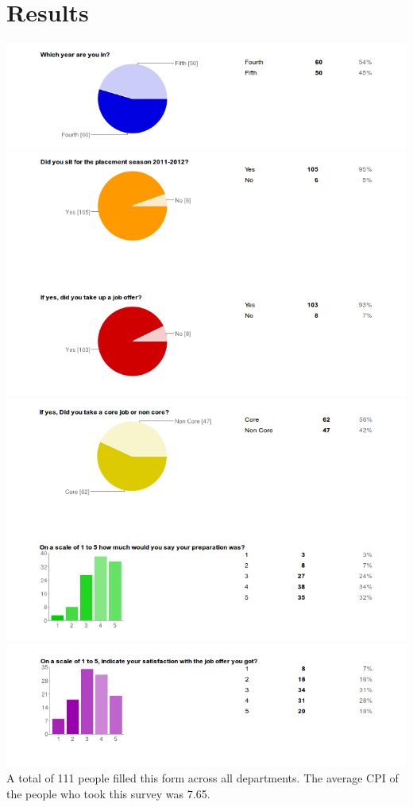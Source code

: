 \documentclass[a4paper,12pt]{report}
\begin{document}
\section{Results}
\includegraphics[scale=.5]{1}\\
\includegraphics[scale=.5]{2}\\
\includegraphics[scale=.5]{3}\\
\includegraphics[scale=.5]{4}\\
A total of 111 people filled this form across all departments. The average CPI of the people who took
 this survey was 7.65.
\end{document}
